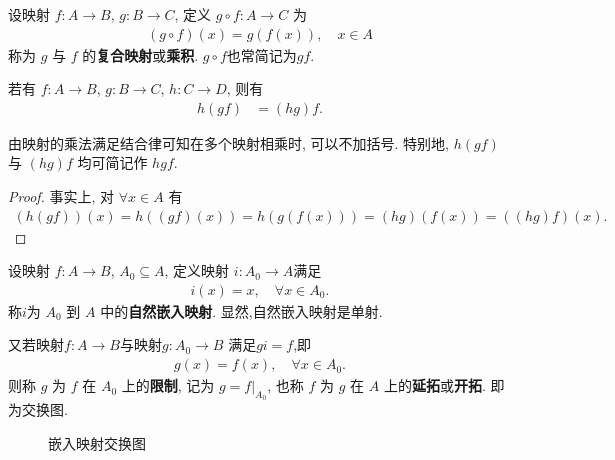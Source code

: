 \documentclass[../../main.tex]{subfiles}%
\begin{document}
\begin{definition}[映射的乘积]
设映射 $f : A \to B$, $g : B \to C$, 定义 $g \circ f : A \to C$ 为
\begin{align*}
(g \circ f)(x) = g(f(x)), \quad x \in A
\end{align*}
称为 $g$ 与 $f$ 的\textbf{复合映射}或\textbf{乘积}. $g \circ f$也常简记为$gf.$
\end{definition}

\begin{theorem}[映射的乘法满足结合律]
若有 \( f: A \to B \), \( g: B \to C \), \( h: C \to D \), 则有
\begin{align*}
h(gf) &= (hg)f. 
\end{align*}
\end{theorem}
\begin{note}
由映射的乘法满足结合律可知在多个映射相乘时, 可以不加括号. 特别地, \( h(gf) \) 与 \( (hg)f \) 均可简记作 \( hgf \).
\end{note}
\begin{proof}

事实上, 对 \( \forall x \in A \) 有
\begin{align*}
(h(gf))(x) = h((gf)(x)) = h(g(f(x))) = (hg)(f(x)) = ((hg)f)(x).
\end{align*}

\end{proof}

\begin{definition}
设映射 $f : A \to B$, $A_0 \subseteq A$, 定义映射 \( i:A_0 \to A \)满足
\begin{align*}
i(x)=x ,\quad \forall x \in A_0.
\end{align*}
称$i$为 \( A_0 \) 到 \( A \) 中的\textbf{自然嵌入映射}. 显然,自然嵌入映射是单射.

又若映射$f : A \to B$与映射$g : A_0 \to B$ 满足$gi=f$,即
\begin{align*}
g(x) = f(x), \quad \forall  x \in A_0.
\end{align*}
则称 $g$ 为 $f$ 在 $A_0$ 上的\textbf{限制}, 记为 $g = f|_{A_0}$, 也称 $f$ 为 $g$ 在 $A$ 上的\textbf{延拓}或\textbf{开拓}. 即为交换图.
\end{definition}
\begin{note}
\begin{figure}[H]
\centering
\caption{嵌入映射交换图}
\label{figure:嵌入映射交换图}
\end{figure}
\end{note}
\end{document}
